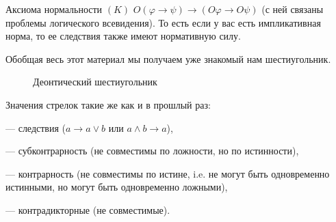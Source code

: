 \documentclass[openany]{book}
\theoremstyle{plain}
\theoremstyle{definition}
\begin{document}
Аксиома нормальности \((K)\) \(O(\varphi \to \psi) \to (O \varphi \to O \psi) \) (с ней связаны проблемы логического всевидения). То есть если у вас есть импликативная норма, то ее следствия также имеют нормативную силу.

Обобщая весь этот материал мы получаем уже знакомый нам шестиугольник.
\begin{figure}[H]
    \centering
    \caption{Деонтический шестиугольник}
\end{figure}
Значения стрелок такие же как и в прошлый раз:
\begin{itemize}
     — следствия (\(a \to a \lor b\) или \(a \land b \to a\)),

     — субконтрарность (не совместимы по ложности, но по истинности),

     — контрарность (не совместимы по истине, i.e. не могут быть одновременно истинными, но могут быть одновременно ложными),

     — контрадикторные (не совместимые).
\end{itemize}
\end{document}
